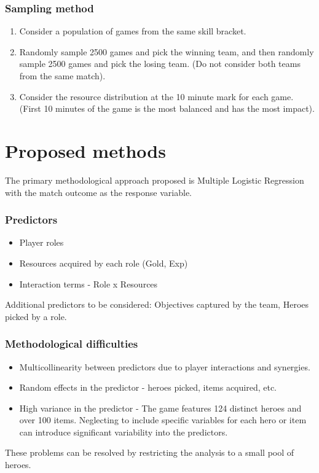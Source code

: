\documentclass[12pt]{scrreprt}
\begin{document}
\subsubsection*{Sampling method}
\begin{enumerate}
    \item Consider a population of games from the same skill bracket.
    \item Randomly sample 2500 games and pick the winning team, and then randomly
    sample 2500 games and pick the losing team. (Do not consider both teams from the same match).
    \item Consider the resource distribution at the 10 minute mark for each game.
    \\(First 10 minutes of the game is the most balanced and has the most impact).
\end{enumerate}

\newpage
\section*{Proposed methods}
The primary methodological approach proposed is Multiple Logistic Regression with
the match outcome as the response variable.
\subsubsection*{Predictors}
\begin{itemize}
    \item Player roles
    \item Resources acquired by each role (Gold, Exp)
    \item Interaction terms - Role x Resources
\end{itemize}
Additional predictors to be considered: Objectives captured by the team, Heroes
picked by a role.

\subsubsection*{Methodological difficulties}
\begin{itemize}
    \item Multicollinearity between predictors due to player interactions and
    synergies.
    \item Random effects in the predictor - heroes picked, items acquired, etc.
    \item High variance in the predictor - The game features 124 distinct heroes
    and over 100 items. Neglecting to include specific variables for each hero
    or item can introduce significant variability into the predictors.
\end{itemize}
These problems can be resolved by restricting the analysis to a small pool of heroes.
\end{document}
